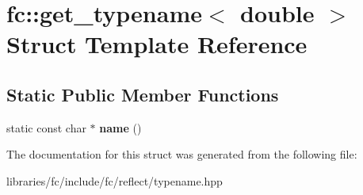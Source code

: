 \hypertarget{structfc_1_1get__typename_3_01double_01_4}{}\section{fc\+:\+:get\+\_\+typename$<$ double $>$ Struct Template Reference}
\label{structfc_1_1get__typename_3_01double_01_4}
\subsection*{Static Public Member Functions}
\begin{DoxyCompactItemize}
\item 
\mbox{\label{structfc_1_1get__typename_3_01double_01_4_a6c82a10faeb51d9054209f58f4209edd}} 
static const char $\ast$ {\bfseries name} ()
\end{DoxyCompactItemize}


The documentation for this struct was generated from the following file\+:\begin{DoxyCompactItemize}
\item 
libraries/fc/include/fc/reflect/typename.\+hpp\end{DoxyCompactItemize}

